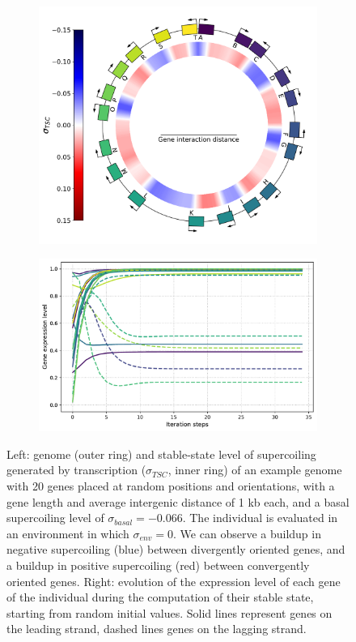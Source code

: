 \begin{figure}[H]
  \centering
  \begin{subfigure}[t]{0.44\textwidth}
    \includegraphics[width=\textwidth]{ploscb/img/random_genome_and_tsc.pdf}
    \label{subfig:random_genome}
  \end{subfigure}
  \begin{subfigure}[t]{0.55\textwidth}
    \includegraphics[width=\textwidth]{ploscb/img/random_gene_expr.pdf}
    \label{subfig:random_expr}
  \end{subfigure}
  \caption{Left: genome (outer ring) and stable-state level of supercoiling generated by transcription ($\sigma_{TSC}$, inner ring) of an example genome with 20 genes placed at random positions and orientations, with a gene length and average intergenic distance of 1 kb each, and a basal supercoiling level of $\sigma_{basal} = -0.066$.
  The individual is evaluated in an environment in which $\sigma_{env} = 0$.
  We can observe a buildup in negative supercoiling (blue) between divergently oriented genes, and a buildup in positive supercoiling (red) between convergently oriented genes.
  Right: evolution of the expression level of each gene of the individual during the computation of their stable state, starting from random initial values.
  Solid lines represent genes on the leading strand, dashed lines genes on the lagging strand.}
  \label{fig:random_indiv}
\end{figure}

